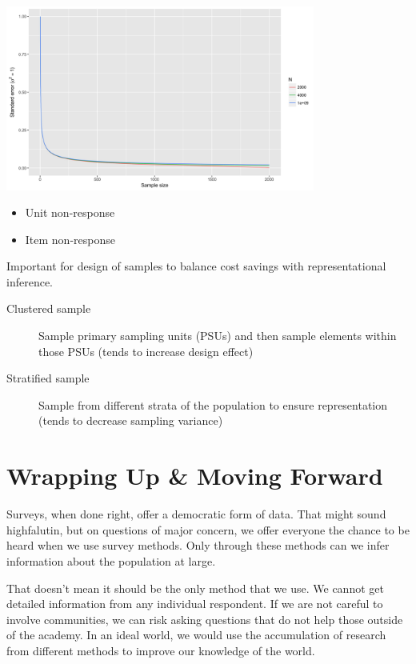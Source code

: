 \documentclass[11pt]{lecturenotes}
\begin{document}
\begin{center}
\includegraphics[width=4in]{../images/sampleSizePlot.jpeg}
\end{center}


\begin{itemize}
\item Unit non-response
\item Item non-response
\end{itemize}


Important for design of samples to balance cost savings with representational inference. 

\begin{description}
\item[Clustered sample] Sample primary sampling units (PSUs) and then sample elements within those PSUs (tends to increase design effect)
\item[Stratified sample] Sample from different strata of the population to ensure representation (tends to decrease sampling variance)
\end{description}

\section[10]{Wrapping Up \& Moving Forward}
Surveys, when done right, offer a democratic form of data. That might sound highfalutin, but on questions of major concern, we offer everyone the chance to be heard when we use survey methods. Only through these methods can we infer information about the population at large. 

That doesn't mean it should be the only method that we use. We cannot get detailed information from any individual respondent. If we are not careful to involve communities, we can risk asking questions that do not help those outside of the academy. In an ideal world, we would use the accumulation of research from different methods to improve our knowledge of the world. 
\end{document}
